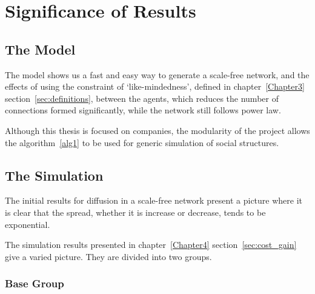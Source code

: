 
\chapter{Significance of Results} %

\label{Chapter5} %



\section{The Model}
The model shows us a fast and easy way to generate a scale-free network, and the effects of using the constraint of `like-mindedness', defined in chapter~\ref{Chapter3} section~\ref{sec:definitions}, between the agents, which reduces the number of connections formed significantly, while the network still follows power law.

Although this thesis is focused on companies, the modularity of the project allows the algorithm~\ref{alg1} to be used for generic simulation of social structures.


\section{The Simulation}

The initial results for diffusion in a scale-free network present a picture where it is clear that the spread, whether it is increase or decrease, tends to be exponential. 

The simulation results presented in chapter~\ref{Chapter4} section~\ref{sec:cost_gain} give a varied picture. They are divided into two groups.

\subsection{Base Group}


